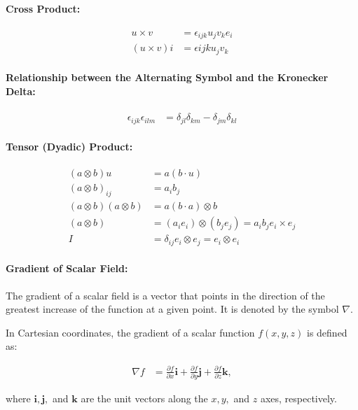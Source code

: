 \paragraph{Cross Product:}
\begin{align}
    u\times v &= \epsilon_{ijk} u_j v_k e_i 
    \\
    (u\times v)i &= \epsilon{ijk} u_j v_k
\end{align}

\paragraph{Relationship between the Alternating Symbol and the Kronecker Delta:}
\begin{align}
\epsilon_{ijk} \epsilon_{ilm} &= \delta_{jl} \delta_{km} - \delta_{jm} \delta_{kl}
\end{align}

\paragraph{Tensor (Dyadic) Product:}
\begin{align}
(a\otimes b)u &= a(b\cdot u)
\\
(a\otimes b)_{ij} &= a_i b_j
\\
(a\otimes b)(a\otimes b) &= a(b\cdot a)\otimes b
\\
(a\otimes b) &= (a_i e_i)\otimes (b_j e_j) = a_i b_j e_i\times e_j
\\
I &= \delta_{ij} e_i\otimes e_j = e_i\otimes e_i
\end{align}

\paragraph{Gradient of Scalar Field:} 
The gradient of a scalar field is a vector that points in the direction of the greatest increase of the function at a given point. It is denoted by the symbol $\nabla$.

In Cartesian coordinates, the gradient of a scalar function $f(x,y,z)$ is defined as:

\begin{align}
\nabla f &= \frac{\partial f}{\partial x} \mathbf{i} + \frac{\partial f}{\partial y} \mathbf{j} + \frac{\partial f}{\partial z} \mathbf{k},
\end{align}

where $\mathbf{i}, \mathbf{j},$ and $\mathbf{k}$ are the unit vectors along the $x,y,$ and $z$ axes, respectively.

